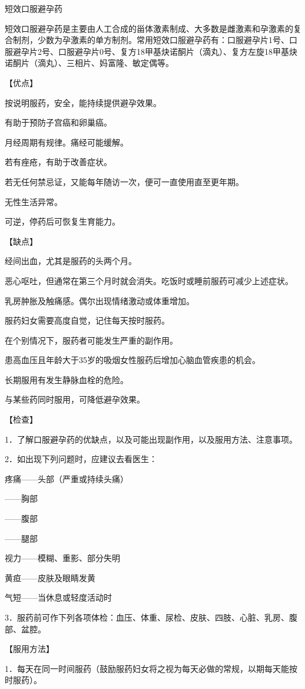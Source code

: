 \documentclass[12pt,UTF8,openany]{ctexbook}
\begin{document}
短效口服避孕药


短效口服避孕药是主要由人工合成的甾体激素制成、大多数是雌激素和孕激素的复合制剂，少数为孕激素的单方制剂。常用短效口服避孕药有：口服避孕片1号、口服避孕片2号、口服避孕片0号、复方18甲基炔诺酮片（滴丸）、复方左旋18甲基炔诺酮片（滴丸）、三相片、妈富隆、敏定偶等。

【优点】

按说明服药，安全，能持续提供避孕效果。

有助于预防子宫癌和卵巢癌。

月经周期有规律。痛经可能缓解。

若有痤疮，有助于改善症状。

若无任何禁忌证，又能每年随访一次，便可一直使用直至更年期。

无性生活异常。

可逆，停药后可恢复生育能力。

【缺点】

经间出血，尤其是服药的头两个月。

恶心呕吐，但通常在第三个月时就会消失。吃饭时或睡前服药可减少上述症状。

乳房肿胀及触痛感。偶尔出现情绪激动或体重增加。

服药妇女需要高度自觉，记住每天按时服药。

在个别情况下，服药者可能发生严重的副作用。

患高血压且年龄大于35岁的吸烟女性服药后增加心脑血管疾患的机会。

长期服用有发生静脉血栓的危险。

与某些药同时服用，可降低避孕效果。

【检查】

1．了解口服避孕药的优缺点，以及可能出现副作用，以及服用方法、注意事项。

2．如出现下列问题时，应建议去看医生：

疼痛——头部（严重或持续头痛）

——胸部

——腹部

——腿部

视力——模糊、重影、部分失明

黄疸——皮肤及眼睛发黄

气短——当休息或轻度活动时

3．服药前可作下列各项体检：血压、体重、尿检、皮肤、四肢、心脏、乳房、腹部、盆腔。

【服用方法】

1．每天在同一时间服药（鼓励服药妇女将之视为每天必做的常规，以期每天能按时服药）。
\end{document}

